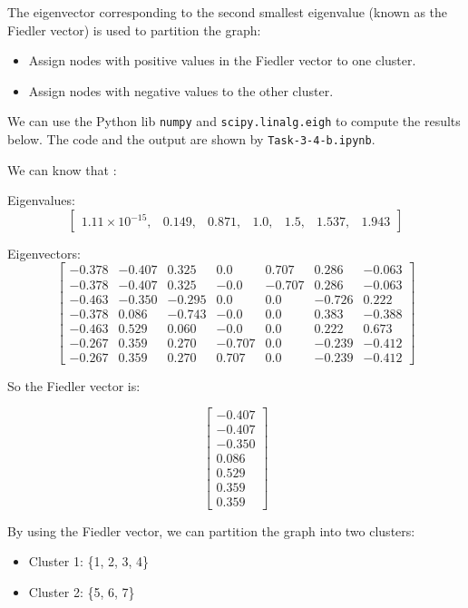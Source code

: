 \documentclass[12pt]{article}
\begin{document}
The eigenvector corresponding to the second smallest eigenvalue (known as the Fiedler vector) is used to partition the graph:
\begin{itemize}
    \item Assign nodes with positive values in the Fiedler vector to one cluster.
    \item Assign nodes with negative values to the other cluster.
\end{itemize}

We can use the Python lib \texttt{numpy} and \texttt{scipy.linalg.eigh} to compute the results below.
The code and the output are shown by \texttt{Task-3-4-b.ipynb}.

We can know that :

Eigenvalues:
\[
\begin{bmatrix}
1.11 \times 10^{-15}, & 0.149, & 0.871, & 1.0, & 1.5, & 1.537, & 1.943
\end{bmatrix}
\]

Eigenvectors:
\[
\begin{bmatrix}
-0.378 & -0.407 &  0.325 &  0.0   &  0.707 &  0.286 & -0.063 \\
-0.378 & -0.407 &  0.325 & -0.0   & -0.707 &  0.286 & -0.063 \\
-0.463 & -0.350 & -0.295 &  0.0   &  0.0   & -0.726 &  0.222 \\
-0.378 &  0.086 & -0.743 & -0.0   &  0.0   &  0.383 & -0.388 \\
-0.463 &  0.529 &  0.060 & -0.0   &  0.0   &  0.222 &  0.673 \\
-0.267 &  0.359 &  0.270 & -0.707 &  0.0   & -0.239 & -0.412 \\
-0.267 &  0.359 &  0.270 &  0.707 &  0.0   & -0.239 & -0.412
\end{bmatrix}
\]

So the Fiedler vector is:

\[
\begin{bmatrix}
-0.407 \\ -0.407 \\ -0.350 \\ 0.086 \\ 0.529 \\ 0.359 \\ 0.359
\end{bmatrix}
\]

By using the Fiedler vector, we can partition the graph into two clusters:
\begin{itemize}
    \item Cluster 1: \{1, 2, 3, 4\}
    \item Cluster 2: \{5, 6, 7\}
\end{itemize}
\end{document}
